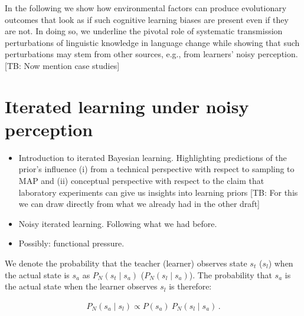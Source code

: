 \documentclass[10pt,a4paper]{article}
\newcommand{\tb}[1]{\textcolor[rgb]{.8,.33,.0}{[TB: #1]}}%
\begin{document}
In the following we show how environmental factors can produce evolutionary outcomes that look as if such cognitive learning biases are present even if they are not. In doing so, we underline the pivotal role of systematic transmission perturbations of linguistic knowledge in language change while showing that such perturbations may stem from other sources, e.g., from learners' noisy perception. \tb{Now mention case studies}



\section{Iterated learning under noisy perception}

\begin{itemize}
  \item Introduction to iterated Bayesian learning. Highlighting predictions of the prior's influence (i) from a technical perspective with respect to sampling to MAP and (ii) conceptual perspective with respect to the claim that laboratory experiments can give us insights into learning priors \tb{For this we can draw directly from what we already had in the other draft}
  \item Noisy iterated learning. Following what we had before.
  \item Possibly: functional pressure.
\end{itemize}

We denote the probability that the teacher (learner) observes state $s_t$ ($s_l$) when the actual state is $s_a$ as $P_N(s_t \mid s_a)$ ($P_N(s_l \mid s_a)$). The probability that $s_a$ is the actual state when the learner observes $s_l$ is therefore:

\begin{align*}
  P_N(s_a \mid s_l) \propto P(s_a) \ P_N(s_l \mid s_a)\,.
\end{align*}
\end{document}
